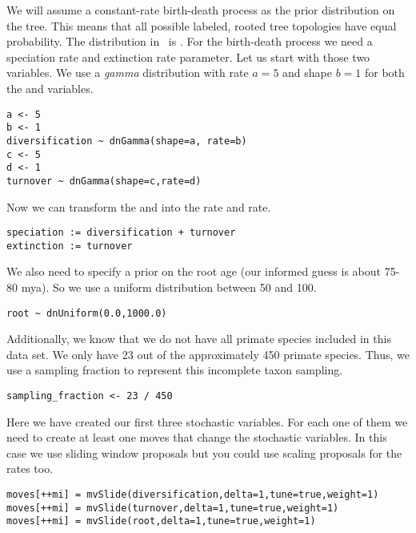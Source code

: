 We will assume a constant-rate birth-death process as the prior distribution on the tree.
This means that all possible labeled, rooted tree topologies have equal probability. 
The distribution in \RevBayes~is . 
For the birth-death process we need a speciation rate and extinction rate parameter.
Let us start with those two variables.
We use a \textit{gamma} distribution with rate $a=5$ and shape $b=1$ for both the  and  variables.
{\tt \begin{snugshade*}
\begin{lstlisting}
a <- 5
b <- 1
diversification ~ dnGamma(shape=a, rate=b)
c <- 5
d <- 1
turnover ~ dnGamma(shape=c,rate=d)
\end{lstlisting}
\end{snugshade*}}
Now we can transform the  and  into the  rate and  rate.
{\tt \begin{snugshade*}
\begin{lstlisting}
speciation := diversification + turnover
extinction := turnover
\end{lstlisting}
\end{snugshade*}}
We also need to specify a prior on the root age (our informed guess is about 75-80 mya).
So we use a uniform distribution between 50 and 100.
{\tt \begin{snugshade*}
\begin{lstlisting}
root ~ dnUniform(0.0,1000.0)
\end{lstlisting}
\end{snugshade*}}
Additionally, we know that we do not have all primate species included in this data set.
We only have 23 out of the approximately 450 primate species.
Thus, we use a sampling fraction to represent this incomplete taxon sampling.
{\tt \begin{snugshade*}
\begin{lstlisting}
sampling_fraction <- 23 / 450
\end{lstlisting}
\end{snugshade*}}
Here we have created our first three stochastic variables.
For each one of them we need to create at least one moves that change the stochastic variables.
In this case we use sliding window proposals but you could use scaling proposals for the rates too.
{\tt \begin{snugshade*}
\begin{lstlisting}
moves[++mi] = mvSlide(diversification,delta=1,tune=true,weight=1)
moves[++mi] = mvSlide(turnover,delta=1,tune=true,weight=1)
moves[++mi] = mvSlide(root,delta=1,tune=true,weight=1)
\end{lstlisting}
\end{snugshade*}}

